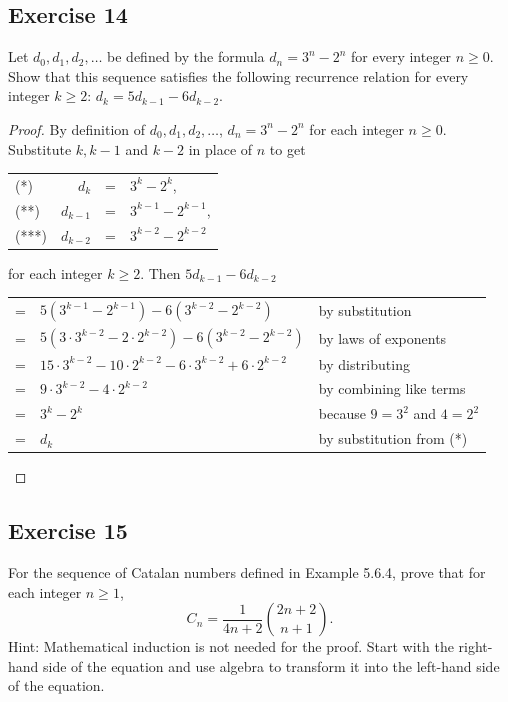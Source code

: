 \documentclass[14pt]{extarticle}
\newcommand{\cy}{\color{cyan}}
\begin{document}
\subsection{Exercise 14}
Let $d_0, d_1, d_2, \ldots$ be defined by the formula $d_n = 3^n - 2^n$ for every integer $n \geq 0$. Show that this 
sequence satisfies the following recurrence relation for every integer $k \geq 2$: $d_k = 5d_{k-1} - 6d_{k-2}$.

\begin{proof}
By definition of $d_0, d_1, d_2, \ldots$, $d_n = 3^n - 2^n$ for each integer $n \geq 0$. Substitute $k, k-1$ and $k-2$ in place of $n$ to get

\begin{tabular}{lrcl}
(*) & $d_k$ & = & $3^k - 2^k$, \\
(**) & $d_{k - 1}$ & = & $3^{k-1} - 2^{k-1}$, \\
(***) & $d_{k - 2}$ & = & $3^{k-2} - 2^{k-2}$
\end{tabular} 

for each integer $k \geq 2$. Then $5d_{k-1} - 6d_{k-2}$

\begin{tabular}{lll}
= & $5(3^{k-1} - 2^{k-1}) - 6(3^{k-2} - 2^{k-2})$ & {\cy by substitution} \\
= & $5(3 \cdot 3^{k-2} - 2 \cdot 2^{k-2}) - 6(3^{k-2} - 2^{k-2})$ & {\cy by laws of exponents} \\
= & $15 \cdot 3^{k-2} - 10 \cdot 2^{k-2} - 6 \cdot 3^{k-2} + 6 \cdot 2^{k-2}$ & {\cy by distributing} \\
= & $9 \cdot 3^{k-2} - 4 \cdot 2^{k-2}$ & {\cy by combining like terms} \\
= & $3^{k} - 2^{k}$ & {\cy because $9 = 3^2$ and $4 = 2^2$} \\
= & $d_k$ & {\cy by substitution from (*)} \\
\end{tabular}
\end{proof}

\subsection{Exercise 15}
For the sequence of Catalan numbers defined in Example 5.6.4, prove that for each integer $n \geq 1$,
\[
C_n = \frac{1}{4n+2}\binom{2n+2}{n+1}.
\]
Hint: Mathematical induction is not needed for the
proof. Start with the right-hand side of the equation and
use algebra to transform it into the left-hand side of the
equation.
\end{document}
